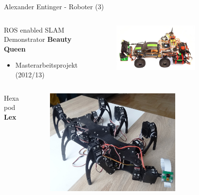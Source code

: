 \documentclass{beamer}
\begin{document}
\begin{frame}{Alexander Entinger - Roboter (3)}
	\begin{columns}
		\begin{column}{0.5\textwidth}
			\begin{large}ROS enabled SLAM Demonstrator \textbf{Beauty Queen}\end{large}
			\begin{itemize}
				\item Masterarbeitsprojekt (2012/13)
			\end{itemize}
		\end{column}
		\begin{column}{0.5\textwidth}
			\begin{figure}[H]
				\centering
				\includegraphics[width=0.7\textwidth]{./images/robot-beauty-queen.jpg}
				\label{fig:robot-beauty-queen}
			\end{figure}
		\end{column}
	\end{columns}
	
	\begin{columns}
		\begin{column}{0.5\textwidth}
			\begin{large}Hexapod \textbf{Lex}\end{large}
		\end{column}
		\begin{column}{0.5\textwidth}
			\begin{figure}[H]
				\centering
				\includegraphics[width=0.7\textwidth]{./images/robot-lex.jpg}
				\label{fig:robot-lex}
			\end{figure}
		\end{column}
	\end{columns}
\end{frame}
\end{document}

